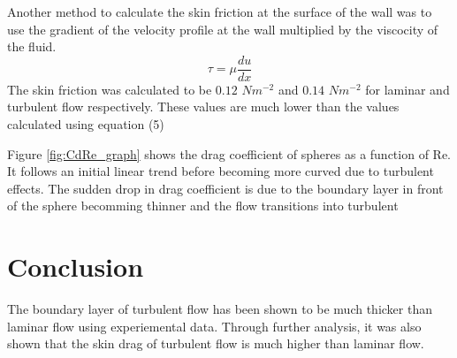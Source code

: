 \documentclass{article}
\begin{document}
Another method to calculate the skin friction at the surface of the wall was to use the
gradient of the velocity profile at the wall multiplied by the viscocity of the fluid.
\begin{equation}
    \tau = \mu \frac{du}{dx}
\end{equation}
The skin friction was calculated to be $ 0.12 $ $Nm^{-2}$ and $ 0.14 $ $Nm^{-2}$ for laminar and turbulent flow respectively.
These values are much lower than the values calculated using equation (5)

Figure \ref{fig:CdRe_graph} shows the drag coefficient of spheres as a function of Re.
It follows an initial linear trend before becoming more curved due to turbulent effects.
The sudden drop in drag coefficient is due to the boundary layer in front of the sphere
becomming thinner and the flow transitions into turbulent 


\section{Conclusion}

The boundary layer of turbulent flow has been shown to be much thicker than laminar flow
using experiemental data. Through further analysis, it was also shown that the 
skin drag of turbulent flow is much higher than laminar flow.
\end{document}
